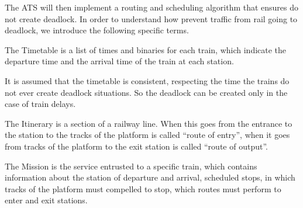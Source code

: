 \documentclass{ewic}
\begin{document}
			
			
			The ATS will then implement a routing and scheduling algorithm that ensures do not create deadlock. In order to understand how prevent traffic from rail going to deadlock, we introduce the following specific terms.
			
			
			The Timetable is a list of times and binaries for each train, which indicate the departure time and the arrival time of the train at each station.
			
			It is assumed that the timetable is consistent, respecting the time the trains do not ever create deadlock situations. So the deadlock can be created only in the case of train delays.
			
			
			The Itinerary is a section of a railway line. When this goes from the entrance to the station to the tracks of the platform is called ``route of entry'', when it goes from tracks of the platform to the exit station is called ``route of output''.
			
			
			The Mission is the service entrusted to a specific train, which contains information about the station of departure and arrival, scheduled stops, in which tracks of the platform must compelled to stop, which routes must perform to enter and exit stations.
			 
\end{document}
